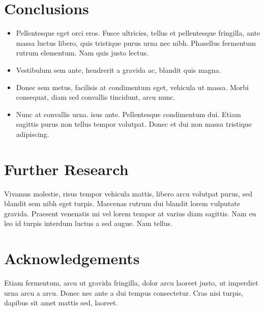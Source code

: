 \documentclass[a0,portrait]{a0poster}
\begin{document}
\begin{multicols}{2}
\section*{Conclusions}
\begin{itemize}
\item Pellentesque eget orci eros. Fusce ultricies, tellus et pellentesque fringilla, ante massa luctus libero, quis tristique purus urna nec nibh. Phasellus fermentum rutrum elementum. Nam quis justo lectus.
\item Vestibulum sem ante, hendrerit a gravida ac, blandit quis magna.
\item Donec sem metus, facilisis at condimentum eget, vehicula ut massa. Morbi consequat, diam sed convallis tincidunt, arcu nunc.
\item Nunc at convallis urna. isus ante. Pellentesque condimentum dui. Etiam sagittis purus non tellus tempor volutpat. Donec et dui non massa tristique adipiscing.
\end{itemize}

\color{DarkSlateGray} %

\section*{Further Research}

Vivamus molestie, risus tempor vehicula mattis, libero arcu volutpat purus, sed blandit sem nibh eget turpis. Maecenas rutrum dui blandit lorem vulputate gravida. Praesent venenatis mi vel lorem tempor at varius diam sagittis. Nam eu leo id turpis interdum luctus a sed augue. Nam tellus.


\nocite{*} %


\section*{Acknowledgements}

Etiam fermentum, arcu ut gravida fringilla, dolor arcu laoreet justo, ut imperdiet urna arcu a arcu. Donec nec ante a dui tempus consectetur. Cras nisi turpis, dapibus sit amet mattis sed, laoreet.

\end{multicols}
\end{document}
